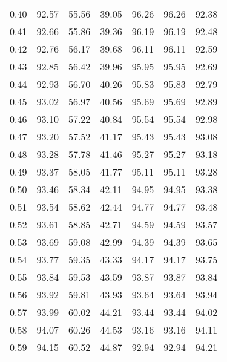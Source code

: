 \begin{tabular}{|c|c|c|c|c|c|c|}
      0.40 &     92.57 &     55.56 &      39.05 &   96.26 &      96.26 &         92.38 \\
      0.41 &     92.66 &     55.86 &      39.36 &   96.19 &      96.19 &         92.48 \\
      0.42 &     92.76 &     56.17 &      39.68 &   96.11 &      96.11 &         92.59 \\
      0.43 &     92.85 &     56.42 &      39.96 &   95.95 &      95.95 &         92.69 \\
      0.44 &     92.93 &     56.70 &      40.26 &   95.83 &      95.83 &         92.79 \\
      0.45 &     93.02 &     56.97 &      40.56 &   95.69 &      95.69 &         92.89 \\
      0.46 &     93.10 &     57.22 &      40.84 &   95.54 &      95.54 &         92.98 \\
      0.47 &     93.20 &     57.52 &      41.17 &   95.43 &      95.43 &         93.08 \\
      0.48 &     93.28 &     57.78 &      41.46 &   95.27 &      95.27 &         93.18 \\
      0.49 &     93.37 &     58.05 &      41.77 &   95.11 &      95.11 &         93.28 \\
      0.50 &     93.46 &     58.34 &      42.11 &   94.95 &      94.95 &         93.38 \\
      0.51 &     93.54 &     58.62 &      42.44 &   94.77 &      94.77 &         93.48 \\
      0.52 &     93.61 &     58.85 &      42.71 &   94.59 &      94.59 &         93.57 \\
      0.53 &     93.69 &     59.08 &      42.99 &   94.39 &      94.39 &         93.65 \\
      0.54 &     93.77 &     59.35 &      43.33 &   94.17 &      94.17 &         93.75 \\
      0.55 &     93.84 &     59.53 &      43.59 &   93.87 &      93.87 &         93.84 \\
      0.56 &     93.92 &     59.81 &      43.93 &   93.64 &      93.64 &         93.94 \\
      0.57 &     93.99 &     60.02 &      44.21 &   93.44 &      93.44 &         94.02 \\
      0.58 &     94.07 &     60.26 &      44.53 &   93.16 &      93.16 &         94.11 \\
      0.59 &     94.15 &     60.52 &      44.87 &   92.94 &      92.94 &         94.21 \\

\end{tabular}
